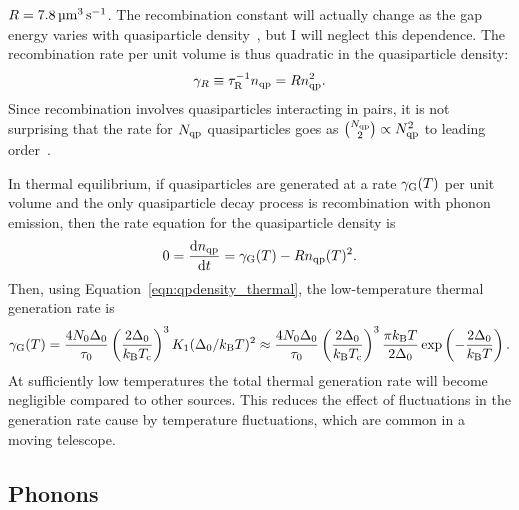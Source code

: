 $R = \SI{7.8}{\micro\meter^3.\second^{-1}}$.
The recombination constant will actually change as the gap energy varies with quasiparticle density~\autocite{Gray1971JPF, Rothwarf1974PRL}, but I will neglect this dependence.
The recombination rate per unit volume is thus quadratic in the quasiparticle density:
\begin{equation}
\gamma_R
  \equiv
  \tau_\mathrm{R}^{-1} n_{\mathrm{qp}}
  =
  R n_{\mathrm{qp}}^2.
\label{eqn:rate_qprecombination}
\end{equation}
Since recombination involves quasiparticles interacting in pairs, it is not surprising that the rate for $N_{\mathrm{qp}}$ quasiparticles goes as $\binom{N_{\mathrm{qp}}}{2} \propto N_{\mathrm{qp}}^2$ to leading order~\autocite{Gray1971JPF}.

In thermal equilibrium, if quasiparticles are generated at a rate $\gamma_{\mathrm{G}}(T)$ per unit volume and the only quasiparticle decay process is recombination with phonon emission, then the rate equation for the quasiparticle density is
\begin{equation}
0
  =
  \dv{n_{\mathrm{qp}}}{t}
  =
  \gamma_{\mathrm{G}}(T)
  -
  R n_{\mathrm{qp}}(T)^2.
\label{eqn:rate_qpdensity_thermal}
\end{equation}
Then, using Equation~\ref{eqn:qpdensity_thermal}, the low-temperature thermal generation rate is
\begin{equation}
\gamma_{\mathrm{G}}(T)
  =
  \frac{4 N_0 \Delta_0}{\tau_0} \left( \frac{2 \Delta_0}{k_\mathrm{B} T_{\mathrm{c}}} \right)^3 K_1(\Delta_0 / k_\mathrm{B} T)^2
  \approx 
  \frac{4 N_0 \Delta_0}{\tau_0} \left( \frac{2 \Delta_0}{k_\mathrm{B} T_{\mathrm{c}}} \right)^3 \frac{\pi k_\mathrm{B} T}{2 \Delta_0} \exp \left(-\frac{2 \Delta_0}{k_\mathrm{B} T}\right).
\label{eqn:rate_generation_thermal}
\end{equation}
At sufficiently low temperatures the total thermal generation rate will become negligible compared to other sources.
This reduces the effect of fluctuations in the generation rate cause by temperature fluctuations, which are common in a moving telescope.


\subsection{Phonons}
\label{sec:theory.quasiparticle.phonons}

